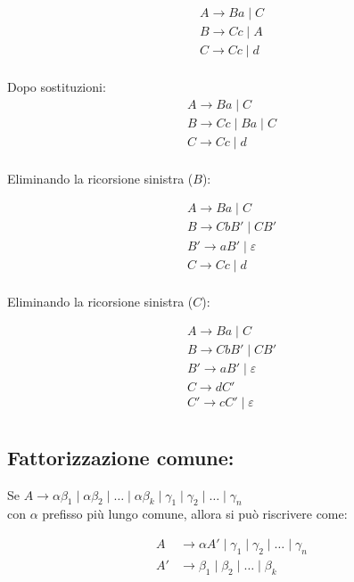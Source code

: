 \[
\begin{array}{l}
A \rightarrow Ba \mid C \\
B \rightarrow Cc \mid A \\
C \rightarrow Cc \mid d \\
\end{array}
\]

\vspace{1em}
Dopo sostituzioni:
\[
\begin{array}{l}
A \rightarrow Ba \mid C \\
B \rightarrow Cc \mid Ba \mid C \\
C \rightarrow Cc \mid d \\
\end{array}
\]

\vspace{1em}
Eliminando la ricorsione sinistra ($B$):

\[
\begin{array}{l}
A \rightarrow Ba \mid C \\
B \rightarrow CbB' \mid CB' \\
B' \rightarrow aB' \mid \varepsilon \\
C \rightarrow Cc \mid d \\
\end{array}
\]

\vspace{1em}
Eliminando la ricorsione sinistra ($C$):

\[
\begin{array}{l}
A \rightarrow Ba \mid C \\
B \rightarrow CbB' \mid CB' \\
B' \rightarrow aB' \mid \varepsilon \\
C \rightarrow dC' \\
C' \rightarrow cC' \mid \varepsilon \\
\end{array}
\]

\subsection{Fattorizzazione comune:}
Se $A \rightarrow \alpha\beta_1 \mid \alpha\beta_2 \mid \ldots \mid \alpha\beta_k \mid \gamma_1 \mid \gamma_2 \mid \ldots \mid \gamma_n$ \\
con $\alpha$ prefisso più lungo comune, allora si può riscrivere come:

\[
\begin{aligned}
A &\rightarrow \alpha A' \mid \gamma_1 \mid \gamma_2 \mid \ldots \mid \gamma_n \\
A' &\rightarrow \beta_1 \mid \beta_2 \mid \ldots \mid \beta_k
\end{aligned}
\]

